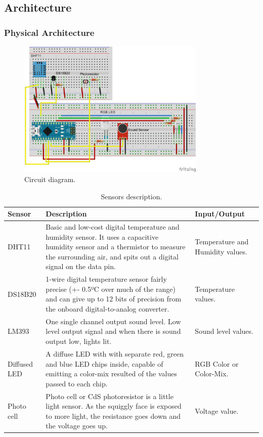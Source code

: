 \documentclass[12pt]{report}
\begin{document}
\subsection{Architecture}

\subsubsection{Physical Architecture}

\begin{figure}[H]
    \centering
    \includegraphics[width=0.8\textwidth]{schematics.png}
    \caption{Circuit diagram.}
    \label{fig:circ}
\end{figure}

\begin{table}[H]
\begin{tabularx}{0.85\textwidth}{ |l|X|p{3cm}| }
  	\hline
  	\textbf{Sensor}  & \textbf{Description} & \textbf{Input/Output} \\
 	\hline
 	DHT11  & Basic and low-cost digital temperature and humidity sensor. It uses a capacitive humidity sensor and a thermistor to measure the surrounding air, and spits out a digital signal on the data pin. & Temperature and Humidity values. \\
 	\hline
 	DS18B20  & 1-wire digital temperature sensor fairly precise (+- 0.5ºC over much of the range) and can give up to 12 bits of precision from the onboard digital-to-analog converter. & Temperature values. \\
 	\hline
 	LM393 & One single channel output sound level. Low level output signal and when there is sound output low, lights lit. & Sound level values. \\
 	\hline
 	Diffused LED & A diffuse LED with with separate red, green and blue LED chips inside, capable of emitting a color-mix resulted of the values passed to each chip. & RGB Color or Color-Mix.\\
 	\hline
 	Photo cell & Photo cell or CdS photoresistor is a little light sensor. As the squiggly face is exposed to more light, the resistance goes down and the voltage goes up. & Voltage value.\\
 	\hline
\end{tabularx}
	\caption{Sensors description.}
  	\label{tab:prolangs}
\end{table}
\end{document}
